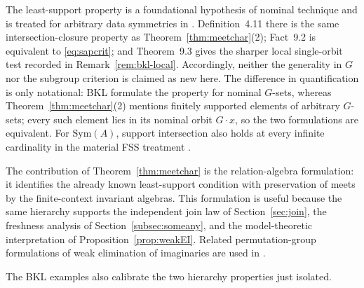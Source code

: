 \documentclass{lmcs}
\newcommand{\Sym}{\mathrm{Sym}}
\begin{document}
\begin{rem}\label{rem:leastlit}
The least-support property is a foundational hypothesis of nominal technique and is treated for arbitrary data symmetries in \cite{BKL14}. Definition~4.11 there is the same intersection-closure property as Theorem~\ref{thm:meetchar}(2); Fact~9.2 is equivalent to \eqref{eq:sapcrit}; and Theorem~9.3 gives the sharper local single-orbit test recorded in Remark~\ref{rem:bkl-local}. Accordingly, neither the generality in $G$ nor the subgroup criterion is claimed as new here. The difference in quantification is only notational: BKL formulate the property for nominal $G$-sets, whereas Theorem~\ref{thm:meetchar}(2) mentions finitely supported elements of arbitrary $G$-sets; every such element lies in its nominal orbit $G\cdot x$, so the two formulations are equivalent. For $\Sym(A)$, support intersection also holds at every infinite cardinality in the material FSS treatment \cite[Chapter~2]{AC20}.

The contribution of Theorem~\ref{thm:meetchar} is the relation-algebra formulation: it identifies the already known least-support condition with preservation of meets by the finite-context invariant algebras. This formulation is useful because the same hierarchy supports the independent join law of Section~\ref{sec:join}, the freshness analysis of Section~\ref{subsec:someany}, and the model-theoretic interpretation of Proposition~\ref{prop:weakEI}. Related permutation-group formulations of weak elimination of imaginaries are used in \cite{Paolini24}.
\end{rem}

The BKL examples also calibrate the two hierarchy properties just isolated.
\end{document}
